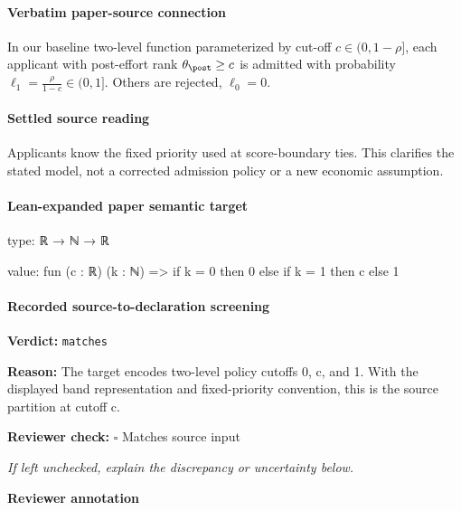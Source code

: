 \documentclass[10pt]{article}
\newcommand{\reviewerbox}{%
  \par\noindent\fbox{\parbox{0.96\linewidth}{\rule{0pt}{0.38in}}}\par
}
\newcommand{\reviewmatch}[1]{%
  \par\noindent\textbf{Reviewer check:} $\square$\; #1\par
  \noindent\emph{If left unchecked, explain the discrepancy or uncertainty below.}\par
}
\begin{document}
\paragraph{Verbatim paper-source connection}
\begin{ReviewVerbatim}
\begin{definition}\label{assump:2-level-fixed-cap} In our baseline two-level function parameterized by cut-off $c \in (0,1-\rho]$, each applicant with post-effort rank  $\theta_\post \geq c$ is admitted with probability $\ell_1 =\frac{\rho}{1-c} \in (0,1]$. Others are rejected, $\ell_0 = 0$.
\end{definition}
\end{ReviewVerbatim}

\paragraph{Settled source reading}
\begin{sloppypar}
Applicants know the fixed priority used at score-\allowbreak{}boundary ties.\allowbreak{} This clarifies the stated model, not a corrected admission policy or a new economic assumption.\allowbreak{}
\end{sloppypar}

\paragraph{Lean-expanded paper semantic target}
\begin{ReviewVerbatim}
type:
ℝ → ℕ → ℝ

value:
fun (c : ℝ) (k : ℕ) => if k = 0 then 0 else if k = 1 then c else 1
\end{ReviewVerbatim}


\paragraph{Recorded source-to-declaration screening}
\textbf{Verdict:} \texttt{matches}
\\
{\raggedright
\textbf{Reason:} The target encodes two-\allowbreak{}level policy cutoffs 0, c, and 1.\allowbreak{} With the displayed band representation and fixed-\allowbreak{}priority convention, this is the source partition at cutoff c.\allowbreak{}
\par}
\reviewmatch{Matches source input}
\noindent\textbf{Reviewer annotation}\par
\reviewerbox
\clearpage
\hypertarget{paper-prerequisite-30d97cd43eb79017}{}
\end{document}
